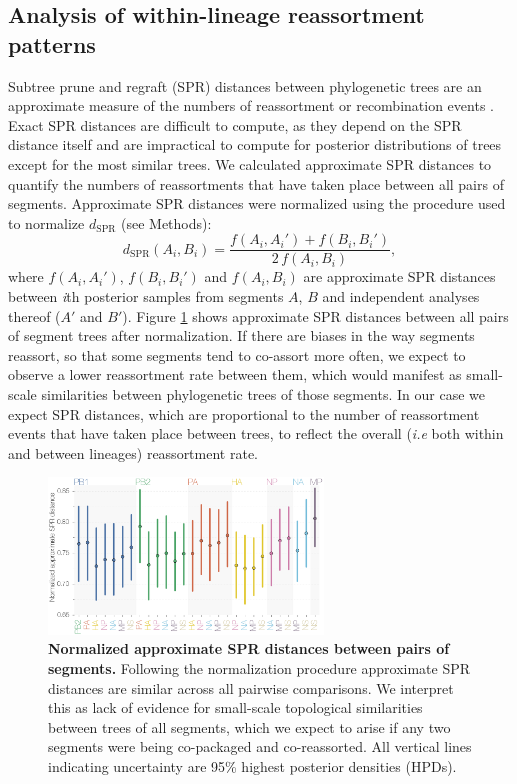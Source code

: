 \documentclass[11pt,oneside,letterpaper]{article}
\newcommand{\dspr}{d_\mathrm{SPR}}
\begin{document}
\subsection*{Analysis of within-lineage reassortment patterns}
Subtree prune and regraft (SPR) distances between phylogenetic trees are an approximate measure of the numbers of reassortment or recombination events \citep{svinti2013}.
Exact SPR distances are difficult to compute, as they depend on the SPR distance itself and are impractical to compute for posterior distributions of trees except for the most similar trees.
We calculated approximate SPR distances \citep{whidden2009,whidden2010,whidden2013} to quantify the numbers of reassortments that have taken place between all pairs of segments.
Approximate SPR distances were normalized using the procedure used to normalize $\dspr$ (see Methods):
\begin{equation}
\dspr(A_i, B_i) = \frac{f(A_i, A_i') + f(B_i, B_i')}{2 \, f(A_i, B_i)},
\end{equation}
where $f(A_i, A_i')$, $f(B_i, B_i')$ and $f(A_i, B_i)$ are approximate SPR distances between \textit{i}th posterior samples from segments $A$, $B$ and independent analyses thereof ($A'$ and $B'$).
Figure \ref{SPRdistances} shows approximate SPR distances between all pairs of segment trees after normalization.
If there are biases in the way segments reassort, so that some segments tend to co-assort more often, we expect to observe a lower reassortment rate between them, which would manifest as small-scale similarities between phylogenetic trees of those segments.
In our case we expect SPR distances, which are proportional to the number of reassortment events that have taken place between trees, to reflect the overall (\textit{i.e} both within and between lineages) reassortment rate.

\begin{figure}[h]
	\centering		
	\includegraphics[width=0.65\textwidth]{supp_figures/InfB_normalizedApproxSPR.png}
	\caption{\textbf{Normalized approximate SPR distances between pairs of segments.}
Following the normalization procedure approximate SPR distances are similar across all pairwise comparisons.
We interpret this as lack of evidence for small-scale topological similarities between trees of all segments, which we expect to arise if any two segments were being co-packaged and co-reassorted.
All vertical lines indicating uncertainty are 95\% highest posterior densities (HPDs).}
	\label{SPRdistances}
\end{figure}
\end{document}

